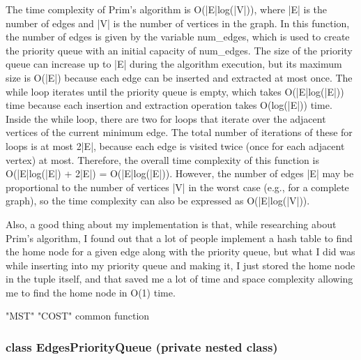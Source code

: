 \documentclass[a4paper]{article}
\begin{document}
			The time complexity of Prim's algorithm is {\color{lightblue}O(|E|log(|V|))}, where {\color{draculapurple}|E|} is the number of edges and 
			{\color{draculapurple}|V|} is the number of vertices in the graph.
			In this function, the number of edges is given by the variable {\color{draculapurple}num\_edges}, which is used to create the priority queue 
			with an initial capacity of {\color{draculapurple}num\_edges}. The size of the priority queue can increase up to {\color{draculapurple}|E|} 
			during the algorithm execution, but its maximum size is {\color{lightblue}O(|E|)} because each edge can be inserted and extracted at most once.
			The while loop iterates until the priority queue is empty, which takes {\color{lightblue}O(|E|log(|E|))} time because each insertion and 
			extraction operation takes {\color{lightblue}O(log(|E|))} time.
			Inside the while loop, there are two for loops that iterate over the adjacent vertices of the current minimum edge. The total number of 
			iterations of these for loops is at most {\color{draculapurple}2|E|}, because each edge is visited twice (once for each adjacent vertex) at most.
			Therefore, the overall time complexity of this function is {\color{lightblue}O(|E|log(|E|) + 2|E|) = O(|E|log(|E|))}.
			However, the number of edges {\color{draculapurple}|E|} may be proportional to the number of vertices {\color{draculapurple}|V|} in the worst
			 case (e.g., for a complete graph), so the time complexity can also be expressed as {\color{lightblue}O(|E|log(|V|))}.
			 
			 Also, a good thing about my implementation is that, while researching about Prim's algorithm, I found out that a lot 
			 of people implement a hash table to find the home node for a given edge along with the priority queue, but what I did was while inserting into my 
			 priority queue and making it, I just stored the home node in the tuple itself, and that saved me a lot of time and space complexity allowing me to find the home node in 
			 {\color{lightblue}O(1)} time.
			 
			 {\color{GoldenYellow}"MST"} {\color{GoldenYellow}"COST"} {\color{pink}common function}

		\subsubsection{{\color{orange}class} {\color{draculapurple}EdgesPriorityQueue} (private nested class)}
\end{document}
